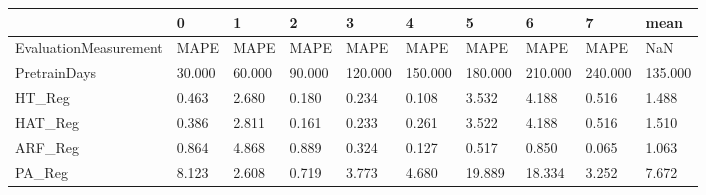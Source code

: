 \begin{tabular}{llllllllll}
\toprule
{} &      0 &      1 &      2 &       3 &       4 &       5 &       6 &       7 &    mean \\
\midrule
EvaluationMeasurement &   MAPE &   MAPE &   MAPE &    MAPE &    MAPE &    MAPE &    MAPE &    MAPE &     NaN \\
PretrainDays          & 30.000 & 60.000 & 90.000 & 120.000 & 150.000 & 180.000 & 210.000 & 240.000 & 135.000 \\
HT\_Reg                &  0.463 &  2.680 &  0.180 &   0.234 &   0.108 &   3.532 &   4.188 &   0.516 &   1.488 \\
HAT\_Reg               &  0.386 &  2.811 &  0.161 &   0.233 &   0.261 &   3.522 &   4.188 &   0.516 &   1.510 \\
ARF\_Reg               &  0.864 &  4.868 &  0.889 &   0.324 &   0.127 &   0.517 &   0.850 &   0.065 &   1.063 \\
PA\_Reg                &  8.123 &  2.608 &  0.719 &   3.773 &   4.680 &  19.889 &  18.334 &   3.252 &   7.672 \\
\bottomrule
\end{tabular}
